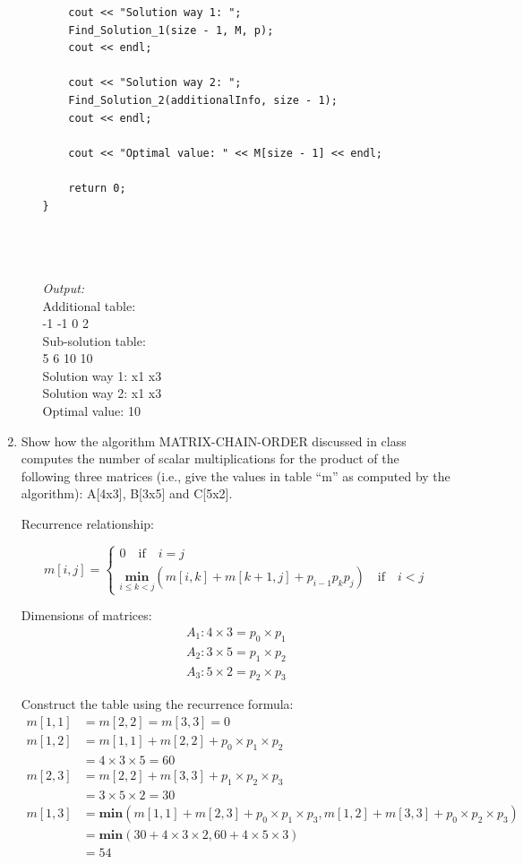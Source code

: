 \documentclass[11pts]{report}
\begin{document}
\begin{enumerate}
\begin{enumerate}
\begin{lstlisting}
    cout << "Solution way 1: ";
    Find_Solution_1(size - 1, M, p);
    cout << endl;

    cout << "Solution way 2: ";    
    Find_Solution_2(additionalInfo, size - 1);
    cout << endl;

    cout << "Optimal value: " << M[size - 1] << endl;

    return 0; 
} 




\end{lstlisting}

\textit{Output:}
\\Additional table:
\\-1 -1 0 2 
\\Sub-solution table: 
\\5 6 10 10 
\\Solution way 1: x1 x3 
\\Solution way 2: x1 x3 
\\Optimal value: 10


\end{enumerate}

\item Show how the algorithm MATRIX-CHAIN-ORDER
discussed in class computes the number of scalar multiplications for the product of the following three matrices (i.e., give the values in table “m” as computed by the algorithm): A[4x3], B[3x5] and C[5x2].

\par Recurrence relationship:

\[
  m[i,j]=\begin{cases}
               0 \quad \text{if} \quad i = j \\
               \underset{i \leq k <
               j}{\textbf{min}} (m[i, k] + m[k+1, j] + p_{i-1}p_kp_j) \quad \text{if} \quad i < j
            \end{cases}
\]

Dimensions of matrices:
\begin{align*} 
A_1: 4 \times 3 = p_0 \times p_1 \\
A_2: 3 \times 5 = p_1 \times p_2 \\
A_3: 5 \times 2 = p_2 \times p_3
\end{align*}
\par Construct the table using the recurrence formula:
\begin{align*}
m[1, 1] &= m[2,2] = m[3,3] = 0\\
m[1, 2] &= m[1, 1] + m[2, 2] + p_0 \times p_1 \times p_2 \\
        &= 4 \times 3 \times 5 = 60 \\
m[2,3] &= m[2,2] + m[3,3] + p_1 \times p_2 \times p_3 \\ &= 3 \times 5 \times 2 = 30 \\
m[1,3] &= \textbf{min}( m[1, 1] + m[2, 3] + p_0 \times p_1 \times p_3, m[1, 2] + m[3, 3] + p_0 \times p_2 \times p_3) \\
       &= \textbf{min}(30 + 4 \times 3 \times 2, 60 + 4 \times 5 \times 3) \\
       &= 54
\end{align*}


\end{enumerate}
\end{document}
